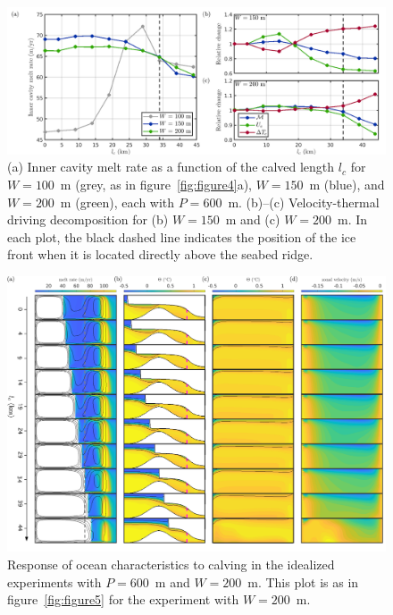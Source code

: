 \documentclass[draft]{agujournal2019}
\begin{document}
\begin{figure}
    \centering
    \includegraphics[width =
    \textwidth]{../make_figures/plots/figure6.png}
    \caption{(a) Inner cavity melt rate as a function of the calved length $l_c$ for $W=100$~m (grey, as in figure~\ref{fig:figure4}a), $W=150$~m (blue), and $W=200$~m (green), each with $P = 600$~m.  (b)--(c) Velocity-thermal driving decomposition for (b) $W = 150$~m and (c) $W = 200$~m. In each plot, the black dashed line indicates the position of the ice front when it is located directly above the seabed ridge.}
    \label{fig:figure6}
\end{figure}

\begin{figure}
    \centering
    \includegraphics[width = \textwidth]{../make_figures/plots/figure7.pdf}
    \caption{Response of ocean characteristics to calving in the idealized experiments with $P=600$~m and $W=200$~m. This plot is as in figure~\ref{fig:figure5} for the experiment with $W=200$~m.}
    \label{fig:figure7}
\end{figure}
\end{document}
